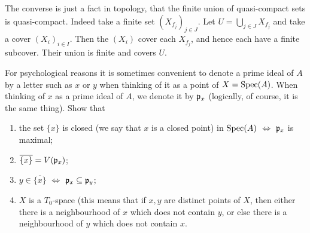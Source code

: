 \documentclass{article}
\begin{document}
\begin{enumerate}
        The converse is just a fact in topology, that the finite union of quasi-compact sets is quasi-compact.
        Indeed take a finite set \((X_{f_j})_{j \in J}\).
        Let \(U = \bigcup_{j \in J} X_{f_j}\) and take a cover \((X_i)_{i \in I}\).
        Then the \((X_i)\) cover each \(X_{f_j}\), and hence each have a finite subcover.
        Their union is finite and covers \(U\).
\end{enumerate}

\begin{exercise}
    For psychological reasons it is sometimes convenient to denote a prime ideal of \(A\) by a letter such as \(x\) or \(y\) when thinking of it as a point of \(X = \operatorname{Spec}(A)\).
    When thinking of \(x\) as a prime ideal of \(A\), we denote it by \(\mathfrak{p}_x\) (logically, of course, it is the same thing).
    Show that
    \begin{enumerate}
        \item
            the set \(\{x\}\) is closed (we say that \(x\) is a closed point) in \(\operatorname{Spec}(A)\) \(\iff\) \(\mathfrak{p}_x\) is maximal;
        \item
            \(\overline{\{x\}} = V(\mathfrak{p}_x)\);
        \item
            \(y \in \overline{\{x\}}\) \(\iff\) \(\mathfrak{p}_x \subseteq \mathfrak{p}_y\);
        \item
            \(X\) is a \(T_0\)-space (this means that if \(x, y\) are distinct points of \(X\), then either there is a neighbourhood of \(x\) which does not contain \(y\), or else there is a neighbourhood of \(y\) which does not contain \(x\).
    \end{enumerate}
\end{exercise}
\end{document}
